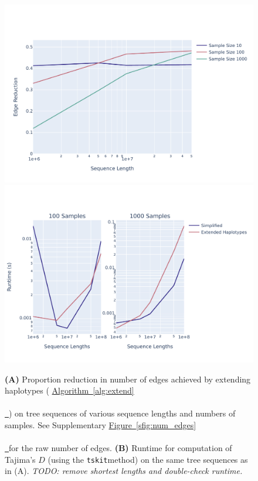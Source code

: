 \documentclass[10pt,twoside,lineno]{gsajnl}
\newcommand{\tskit}{\texttt{tskit}}
\newcommand{\comment}[1]{{\color{violet} \it #1}}
\newcommand{\algorithmref}[2][]{%
	\hyperref[{#2}]{%
		Algorithm~\ref*{#2}%
		\ifx\\#1\\%
		\else
		\,#1%
		\fi
	}%
}
\newcommand*{\figref}[2][]{%
	\hyperref[{#2}]{%
		Figure~\ref*{#2}%
		\ifx\\#1\\%
		\else
		\,#1%
		\fi
	}%
}
\begin{document}
\begin{figure}
    \includegraphics[width=0.9\linewidth]{newplots_wo_ee/edge_reduction_prop_vs_SL}
    \includegraphics{newplots_wo_ee/simp_vs_ext_tajimasD_runtime_SL}
    \caption{
        \textbf{(A)} Proportion reduction in number of edges
        achieved by extending haplotypes (\algorithmref{alg:extend})
        on tree sequences of various sequence lengths and numbers of samples.
        See Supplementary \figref{sfig:num_edges} for the raw number of edges.
        \textbf{(B)} Runtime for computation of Tajima's $D$
        (using the \tskit method) on the same tree sequences as in (A).
        \comment{TODO: remove shortest lengths and double-check runtime.}
        \label{fig:num_edges}
    }
\end{figure}
\end{document}
